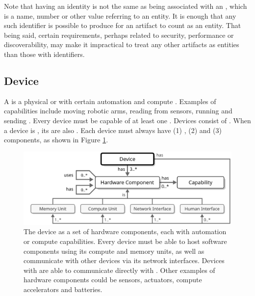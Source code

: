 Note that having an identity is not the same as being associated with an , which is a name, number or other value referring to an entity.
It is enough that any such identifier is possible to produce for an artifact to count as an entity.
That being said, certain  requirements, perhaps related to security, performance or discoverability, may make it impractical to treat any other artifacts as entities than those with identifiers.

\subsection{Device}
\label{sec:concepts:device}

A  is a physical or   with certain automation and compute .
Examples of capabilities include moving robotic arms, reading from sensors, running  and sending .
Every device must be capable of  at least one  .
Devices consist of .
When a device is , its  are also .
Each device must always have (1) , (2)  and (3)  components, as shown in Figure \ref{fig:device}.

\begin{figure}[ht!]
  \centering
  \includegraphics[scale=0.9]{figures/device}
  \caption{
    The device as a set of hardware components, each with automation or compute capabilities.
    Every device must be able to host software components using its compute and memory units, as well as communicate with other devices via its network interfaces.
    Devices with  are able to communicate directly with .
    Other examples of hardware components could be sensors, actuators, compute accelerators and batteries.
  }
  \label{fig:device}
\end{figure}

